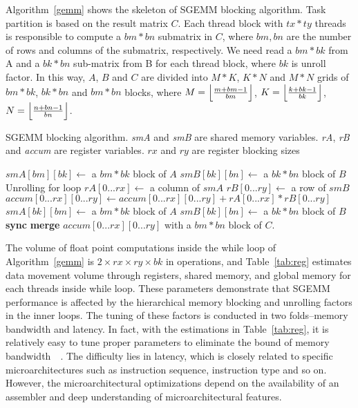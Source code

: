 Algorithm~\ref{gemm} shows the skeleton of SGEMM blocking algorithm. Task partition is based on the result matrix $C$. Each thread block with $tx*ty$ threads is responsible to compute a $bm*bn$ submatrix in $C$, where $bm, bn$ are the number of rows and columns of the submatrix, respectively. We need read a $bm*bk$ from A and a $bk*bn$ sub-matrix from B for each thread block, where $bk$ is unroll factor. In this way, $A$, $B$ and $C$ are divided into $M*K$, $K*N$ and $M*N$ grids of $bm*bk$, $bk*bn$ and $bm*bn$ blocks, where $M=\Bigl\lfloor \frac{m+bm-1}{bm} \Bigr\rfloor$, $K=\Bigl\lfloor \frac{k+bk-1}{bk} \Bigr\rfloor$, $N=\Bigl\lfloor \frac{n+bn-1}{bn} \Bigr\rfloor$.

\begin{algorithm}
  \caption{SGEMM blocking algorithm. {\em smA} and {\em smB} are shared memory variables. {\em rA}, {\em rB} and {\em accum} are register variables. $rx$ and $ry$ are register blocking sizes}\label{gemm}
  \begin{algorithmic}[1]
	\State $smA[bm][bk] \gets$ a $bm * bk$ block of $A$
	\State $smB[bk][bn] \gets$ a $bk * bn$ block of $B$
	\Do
	 \Comment Unrolling for loop
	\State $rA[0...rx]\gets$ a column of $smA$
	\State $rB[0...ry]\gets$ a row of $smB$
	\State $accum[0...rx][0...ry]\gets accum[0...rx][0...ry]+rA[0...rx]*rB[0...ry]$
	\EndFor
	\State $smA[bk][bm]\gets$ a $bm*bk$ block of $A$
	\State $smB[bk][bn]\gets$ a $bk*bn$ block of $B$
	\State \textbf{sync}
	\State \textbf{merge} $accum[0...rx][0...ry]$ with a $bm*bn$ block of $C$.
  \end{algorithmic}
\end{algorithm}

The volume of float point computations inside the while loop of Algorithm~\ref{gemm} is $2\times rx\times ry \times bk$ in operations, and Table~\ref{tab:reg} estimates data movement volume through registers, shared memory, and global memory for each threads inside while loop.
These parameters demonstrate that SGEMM performance is affected by the hierarchical memory blocking and unrolling factors in the inner loops.
The tuning of these factors is conducted in two folds--memory bandwidth and latency. In fact, with the estimations in Table~\ref{tab:reg}, it is relatively easy to tune proper parameters to eliminate the bound of memory bandwidth~\cite{magma}~\cite{tan}. The difficulty lies in latency, which is closely related to specific microarchitectures such as instruction sequence, instruction type and so on. However, the microarchitectural optimizations depend on the availability of an assembler and deep understanding of microarchitectural features. %


